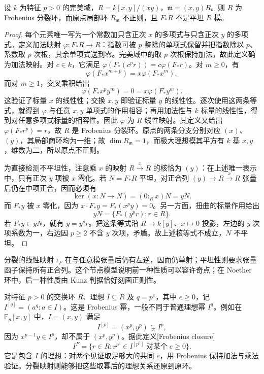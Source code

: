 \begin{example}[分裂不等于正则]\label{b3:exm:node-frobenius-split}
	设 \(k\) 为特征 \(p>0\) 的完美域，\(R=k[x,y]/(xy)\)，\(\mathfrak m=(x,y)R\)。则 \(R\) 为 Frobenius 分裂环，而原点局部环 \(R_{\mathfrak m}\) 不正则，且 \(F_*R\) 不是平坦 \(R\) 模。
\end{example}
\begin{proof}
	每个元素唯一写为一个常数加只含正次 \(x\) 的多项式与只含正次 \(y\) 的多项式。定义加法映射 \(\varphi:F_*R\to R\)：指数可被 \(p\) 整除的单项式保留并把指数除以 \(p\)、系数取 \(p\) 次根，其余单项式送到零。完美域中的取 \(p\) 次根保持加法，故此定义确为加法映射。对 \(c\in k\)，它满足 \(\varphi(F_*(c^pr))=c\varphi(F_*r)\)。对 \(m\ge0\)，有
	\[
		\varphi(F_*x^{m+p})=x\varphi(F_*x^m),
	\]
	而对 \(m\ge1\)，交叉乘积给出
	\[
		\varphi(F_*x^py^m)=0=x\varphi(F_*y^m).
	\]
	这验证了标量 \(x\) 的线性性；交换 \(x,y\) 即验证标量 \(y\) 的线性性。逐次使用这两条等式，就得到 \(\varphi\) 与任意 \(x,y\) 单项式的作用相容；再用加法性与 \(k\) 标量的线性性，得到对任意多项式标量的相容性。因此 \(\varphi\) 为 \(R\) 线性映射。其定义又给出 \(\varphi(F_*r^p)=r\)，故 \(R\) 是 Frobenius 分裂环。原点的两条分支分别对应 \((x)\)、\((y)\)，其局部商环均为一维；故 \(\dim R_{\mathfrak m}=1\)，而极大理想模其平方有 \(k\) 基 \(x,y\)，维数为二，所以原点不正则。

	为直接检测不平坦性，注意乘 \(x\) 的映射 \(R\xrightarrow{x}R\) 的核恰为 \((y)\)：在上述唯一表示中，只有正次 \(y\) 项被 \(x\) 零化。若 \(N=F_*R\) 平坦，对正合列 \((y)\to R\xrightarrow{x}R\) 张量后仍在中项正合，因而必须有
	\[
		\ker(x:N\to N)=(0:_Rx)N=yN.
	\]
	而 \(F_*y\) 被 \(x\) 零化，因为 \(x\cdot F_*y=F_*(x^py)=0\)。另一方面，扭曲的标量作用给出
	\[
		yN=\{F_*(y^pr):r\in R\}.
	\]
	若 \(F_*y\in yN\)，就有 \(y=y^pr\)。把这条等式沿 \(R\to k[y]\)、\(x\mapsto0\) 投影，左边的 \(y\) 次项系数为一，右边因 \(p\ge2\) 不含 \(y\) 次项，矛盾。故上述核等式不成立，\(N\) 不平坦。
\end{proof}

分裂的线性映射 \(\iota_F\) 在与任意模张量后仍有左逆，因而仍单射；平坦性则要求张量函子保持所有正合列。这个节点模型说明前一种性质可以容许奇点；在 Noether 环中，后一种性质由 Kunz 判据恰好刻画正则性。

\ProseParagraphBreak
对特征 \(p>0\) 的交换环 \(R\)、理想 \(I\subseteq R\) 及 \(q=p^e\)，其中 \(e\ge0\)，记 \(I^{[q]}=(a^q:a\in I)\)。这是 Frobenius 幂，一般不同于普通理想幂 \(I^q\)。例如在 \(\mathbb F_p[x,y]\) 中，\(I=(x,y)\) 满足
\[
	I^{[p]}=(x^p,y^p)\subsetneq I^p,
\]
因为 \(x^{p-1}y\in I^p\)，却不属于 \((x^p,y^p)\)。据此定义[Frobenius closure]
\[
	I^F=\{r\in R:r^{p^e}\in I^{[p^e]}\;\text{对某个}\;e\ge0\}.
\]
它是包含 \(I\) 的理想：对两个见证取足够大的共同 \(e\)，用 Frobenius 保持加法与乘法验证。分裂映射则能够把这些取幂后的理想关系还原到原环。

